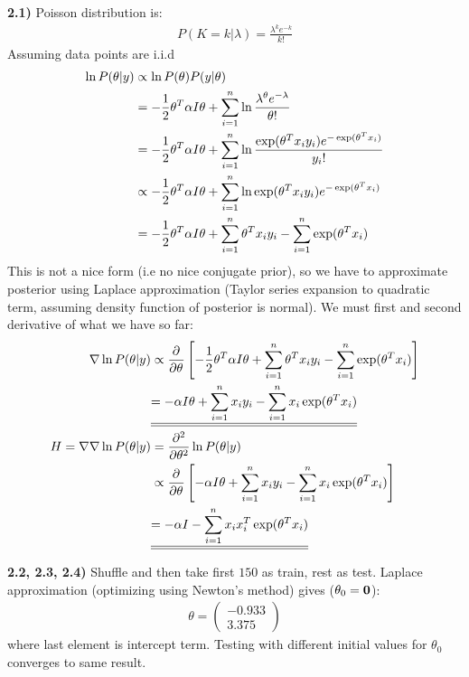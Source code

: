 \documentclass[12pt]{article}
\begin{document}
\textbf{2.1)} Poisson distribution is:
\begin{align}
    P(K = k|\lambda) = \frac{\lambda^k e^{-k}}{k!}
\end{align}
Assuming data points are i.i.d 
\allowdisplaybreaks
\begin{align}
    \ln P(\theta|y) &\propto \ln P(\theta)P(y|\theta) \\
    &= -\frac{1}{2} \theta^T \alpha I \theta + \sumlim{1}{n} \ln \frac{\lambda^\theta e^{-\lambda}}{\theta!} \\ 
    &= -\frac{1}{2} \theta^T \alpha I \theta + \sumlim{1}{n} \ln \frac{\exp(\theta^T x_i y_i) e^{-\exp(\theta^T x_i)}}{y_i!} \\ 
    &\propto -\frac{1}{2} \theta^T \alpha I \theta + \sumlim{1}{n} \ln \exp(\theta^T x_i y_i) e^{-\exp(\theta^T x_i)} \\ 
    &= -\frac{1}{2} \theta^T \alpha I \theta + \sumlim{1}{n} \theta^T x_i y_i - \sumlim{1}{n} \exp(\theta^T x_i) 
\end{align}
This is not a nice form (i.e no nice conjugate prior), so we have to approximate posterior using Laplace approximation (Taylor series expansion to quadratic term, assuming density function of posterior is normal). We must first and second derivative of what we have so far:
\begin{align}
    \nabla \ln P(\theta|y) &\propto \pfrac{}{\theta} \enclb{-\frac{1}{2} \theta^T \alpha I \theta + \sumlim{1}{n} \theta^T x_i y_i - \sumlim{1}{n} \exp(\theta^T x_i)}\\ 
    &\dunderline{= - \alpha I \theta + \sumlim{1}{n} x_i y_i - \sumlim{1}{n} x_i \exp(\theta^Tx_i)} \\
    H = \nabla\nabla\ln P(\theta|y) &= \pfrac[2]{}{\theta} \ln P(\theta|y) \\ 
    &\propto \pfrac{}{\theta} \enclb{- \alpha I \theta + \sumlim{1}{n} x_i y_i - \sumlim{1}{n} x_i \exp(\theta^Tx_i)} \\
    &\dunderline{= - \alpha I - \sumlim{1}{n} x_ix_i^T \exp(\theta^Tx_i)}
\end{align}

\textbf{2.2, 2.3, 2.4)} Shuffle and then take first $150$ as train, rest as test. Laplace approximation (optimizing using Newton's method) gives ($\theta_0 = \bs 0$):
\begin{align}
    \theta = 
    \begin{pmatrix}
        -0.933 \\
        3.375
    \end{pmatrix}
\end{align}
where last element is intercept term. Testing with different initial values for $\theta_0$ converges to same result.
\end{document}
